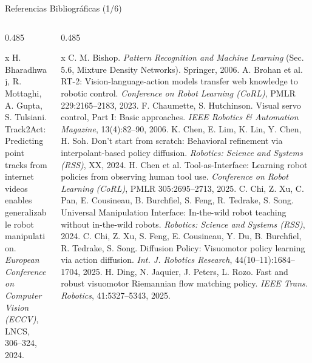 \documentclass[aspectratio=169,10pt,xcolor={dvipsnames,table}]{beamer}
\begin{document}
\begin{frame}{Referencias Bibliográficas (1/6)}
\begin{columns}[T, onlytextwidth]
\begin{column}{0.485\textwidth}
\begin{thebibliography}{x}
         H. Bharadhwaj, R. Mottaghi, A. Gupta, S. Tulsiani. \newblock Track2Act: Predicting point tracks from internet videos enables generalizable robot manipulation. \newblock \emph{European Conference on Computer Vision (ECCV)}, LNCS, 306--324, 2024.
      \end{thebibliography}
    \end{column}
    \begin{column}{0.485\textwidth}
      \RefsFont
      \begin{thebibliography}{x}\setlength{\itemsep}{0.8pt}
         C. M. Bishop. \newblock \emph{Pattern Recognition and Machine Learning} (Sec. 5.6, Mixture Density Networks). \newblock Springer, 2006.
         A. Brohan et al. \newblock RT-2: Vision-language-action models transfer web knowledge to robotic control. \newblock \emph{Conference on Robot Learning (CoRL)}, PMLR 229:2165--2183, 2023.
         F. Chaumette, S. Hutchinson. \newblock Visual servo control, Part I: Basic approaches. \newblock \emph{IEEE Robotics \& Automation Magazine}, 13(4):82--90, 2006.
         K. Chen, E. Lim, K. Lin, Y. Chen, H. Soh. \newblock Don't start from scratch: Behavioral refinement via interpolant-based policy diffusion. \newblock \emph{Robotics: Science and Systems (RSS)}, XX, 2024.
         H. Chen et al. \newblock Tool-as-Interface: Learning robot policies from observing human tool use. \newblock \emph{Conference on Robot Learning (CoRL)}, PMLR 305:2695--2713, 2025.
         C. Chi, Z. Xu, C. Pan, E. Cousineau, B. Burchfiel, S. Feng, R. Tedrake, S. Song. \newblock Universal Manipulation Interface: In-the-wild robot teaching without in-the-wild robots. \newblock \emph{Robotics: Science and Systems (RSS)}, 2024.
         C. Chi, Z. Xu, S. Feng, E. Cousineau, Y. Du, B. Burchfiel, R. Tedrake, S. Song. \newblock Diffusion Policy: Visuomotor policy learning via action diffusion. \newblock \emph{Int. J. Robotics Research}, 44(10--11):1684--1704, 2025.
         H. Ding, N. Jaquier, J. Peters, L. Rozo. \newblock Fast and robust visuomotor Riemannian flow matching policy. \newblock \emph{IEEE Trans. Robotics}, 41:5327--5343, 2025.
      \end{thebibliography}
    \end{column}
  \end{columns}
\end{frame}
\end{document}
